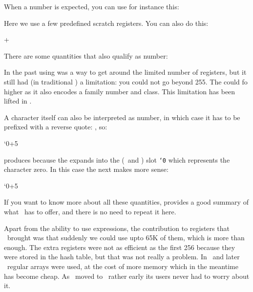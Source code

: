 When a number is expected, you can use for instance this:

\starttyping[option=TEX]
\scratchcounter\scratchcounterone
\stoptyping

Here we use a few predefined scratch registers. You can also do this:

\starttyping[option=TEX]
\scratchcounter\numexpr\scratchcounterone+\scratchcountertwo\relax
\stoptyping

There are some quantities that also qualify as number:

\starttyping[option=TEX]
\chardef{} %
\scratchcounter\MyChar
\stoptyping

In the past using \type {\chardef} was a way to get around the limited number of
registers, but it still had (in traditional \TEX) a limitation: you could not go
beyond 255. The \type {\mathchardef} could fo higher as it also encodes a family
number and class. This limitation has been lifted in \LUATEX.

A character itself can also be interpreted as number, in which case it has to be
prefixed with a reverse quote: , so:

\startbuffer
\scratchcounter\numexpr`0+5\relax
\char\scratchcounter
\stopbuffer

\typebuffer[option=TEX]

produces \quotation {\inlinebuffer} because the  expands into the
(\ASCII\ and ) slot {\tt \number`0} which represents the character zero. In
this case the next makes more sense:

\starttyping[option=TEX]
\char\numexpr`0+5\relax
\stoptyping

If you want to know more about all these quantities, 
provides a good summary of what \TEX\ has to offer, and there is no need to repeat
it here.

\stopsectionlevel

\startsectionlevel[title={\ETEX\ primitives}]

Apart from the ability to use expressions, the contribution to registers that
\ETEX\ brought was that suddenly we could use upto 65K of them, which is more
than enough. The extra registers were not as efficient as the first 256 because
they were stored in the hash table, but that was not really a problem. In \OMEGA\
and later \LUATEX\ regular arrays were used, at the cost of more memory which in
the meantime has become cheap. As \CONTEXT\ moved to \ETEX\ rather early its
users never had to worry about it.

